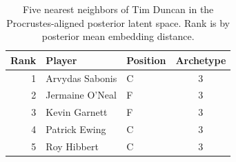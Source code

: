 \begin{table}[htbp]
  \centering\small
  \begin{tabular}{rllc}
    \toprule
    Rank & Player & Position & Archetype \\
    \midrule
    1 & Arvydas Sabonis & C & 3 \\
    2 & Jermaine O'Neal & F & 3 \\
    3 & Kevin Garnett & F & 3 \\
    4 & Patrick Ewing & C & 3 \\
    5 & Roy Hibbert & C & 3 \\
    \bottomrule
  \end{tabular}
  \caption{Five nearest neighbors of Tim Duncan in the Procrustes-aligned posterior latent space. Rank is by posterior mean embedding distance.}
  \label{tab:Tim_Duncan_neighbors}
\end{table}

